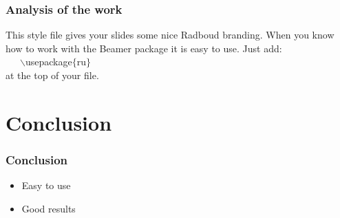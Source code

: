 \documentclass{beamer}
\begin{document}
\begin{frame}
	  \frametitle{Analysis of the work}

	    This style file gives your slides some nice Radboud branding.
	    When you know how to work with the Beamer package it is easy to use.
	    Just add:\\ ~~~$\backslash$usepackage$\{$ru$\}$ \\ at the top of your file.
\end{frame}

\section{Conclusion}

\begin{frame}
	  \frametitle{Conclusion}

	  \begin{itemize}
	  	\item Easy to use
		\item Good results
	  \end{itemize}
\end{frame}
\end{document}
